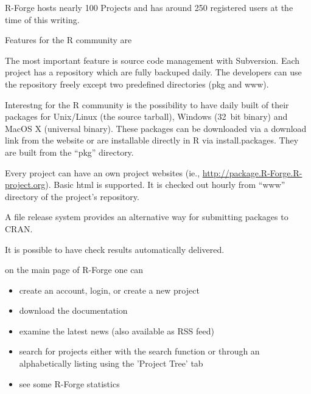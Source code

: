 R-Forge hosts nearly 100 Projects and has around 250 registered users at the
time of this writing.




Features for the R community are 


The most important feature is source code management with
Subversion. Each project has a repository which are fully backuped
daily. The developers can use the repository
freely except two predefined directories (pkg and www). %

Interestng for the R community is the possibility to have daily built
of their packages for Unix/Linux (the source tarball), Windows
(32~bit binary) and MacOS X (universal binary). These packages can be
downloaded via a download link from the website or are installable
directly in R via install.packages. They are built from the ``pkg''
directory.

Every project can have an own project websites (ie.,
\url{http://package.R-Forge.R-project.org}). Basic html is
supported. It is checked out hourly from ``www'' directory of the
project's repository.

A file release system provides an
alternative way for submitting packages to CRAN. 

It is possible to have check results automatically delivered. 



on the main page of R-Forge one can

\begin{itemize}

\item create an account, login, or create a new project

\item download the documentation

\item examine the latest news (also available as RSS feed)

\item search for projects either with the search function or through an
  alphabetically listing using the 'Project Tree' tab 

\item see some R-Forge statistics

\end{itemize}


